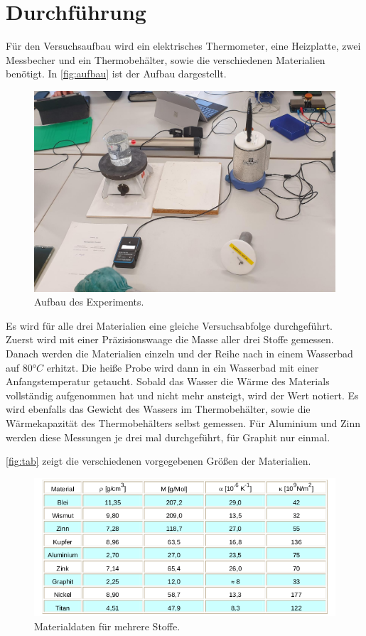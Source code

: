 \section{Durchführung}
\label{sec:Durchführung}

Für den Versuchsaufbau wird ein elektrisches Thermometer, eine Heizplatte, zwei Messbecher und ein Thermobehälter, sowie die verschiedenen Materialien benötigt.
In \autoref{fig:aufbau} ist der Aufbau dargestellt.

\begin{figure}[htbp]
    \centering
    \includegraphics[width=\textwidth]{content/Bilder/Aufbau.jpg}
    \caption{Aufbau des Experiments.}
    \label{fig:aufbau}
\end{figure}


Es wird für alle drei Materialien eine gleiche Versuchsabfolge durchgeführt.\\
Zuerst wird mit einer Präzisionswaage die Masse aller drei Stoffe gemessen.
Danach werden die Materialien einzeln und der Reihe nach in einem Wasserbad auf $80°C$ erhitzt.
Die heiße Probe wird dann in ein Wasserbad mit einer Anfangstemperatur getaucht.
Sobald das Wasser die Wärme des Materials vollständig aufgenommen hat und nicht mehr ansteigt, wird der Wert notiert.
Es wird ebenfalls das Gewicht des Wassers im Thermobehälter, sowie die Wärmekapazität des Thermobehälters selbst gemessen.
Für Aluminium und Zinn werden diese Messungen je drei mal durchgeführt, für Graphit nur einmal.\\
\newpage

\autoref{fig:tab} zeigt die verschiedenen vorgegebenen Größen der Materialien.
\begin{figure}[htbp]
    \centering
    \includegraphics[width=\textwidth]{content/Bilder/Tabelle.png}
    \caption{Materialdaten für mehrere Stoffe.}
    \label{fig:tab}
\end{figure}